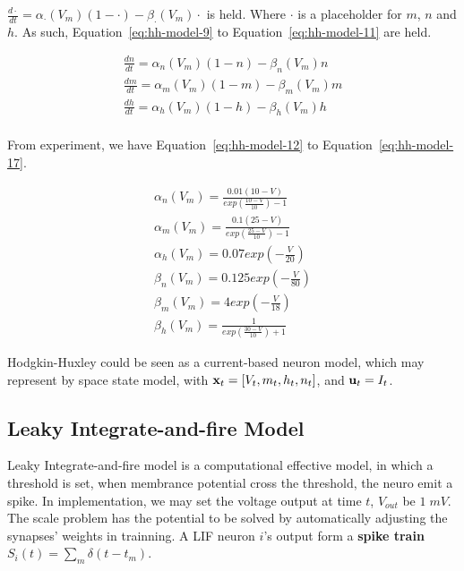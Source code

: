 $\frac{d\cdot}{dt}= \alpha_\cdot(V_m)(1-\cdot)-\beta_\cdot(V_m)\cdot $ is held. Where $\cdot$ is a placeholder for
$m$, $n$ and $h$. As such, Equation~\ref{eq:hh-model-9} to Equation~\ref{eq:hh-model-11} are held.

\begin{align}
    \frac{dn}{dt}= \alpha_n(V_m)(1-n)-\beta_n(V_m)n \label{eq:hh-model-9}\\
    \frac{dm}{dt}= \alpha_m(V_m)(1-m)-\beta_m(V_m)m \label{eq:hh-model-10}\\
    \frac{dh}{dt}= \alpha_h(V_m)(1-h)-\beta_h(V_m)h \label{eq:hh-model-11}\\
\end{align}

From experiment, 
we have Equation~\ref{eq:hh-model-12} to Equation~\ref{eq:hh-model-17}.

\begin{align}
    \alpha_n(V_m) = \frac{0.01(10-V)}{exp(\frac{10-V}{10}) - 1} \label{eq:hh-model-12}\\
    \alpha_m(V_m) = \frac{0.1(25-V)}{exp(\frac{25-V}{10}) - 1} \label{eq:hh-model-13}\\
    \alpha_h(V_m) = 0.07exp(-\frac{V}{20}) \label{eq:hh-model-14}\\
    \beta_n(V_m) = 0.125exp(-\frac{V}{80}) \label{eq:hh-model-15}\\
    \beta_m(V_m) = 4exp(-\frac{V}{18}) \label{eq:hh-model-16}\\
    \beta_h(V_m) = \frac{1}{exp(\frac{30-V}{10})+1} \label{eq:hh-model-17}
\end{align}

Hodgkin-Huxley could be seen as a current-based neuron model, which may represent by space state model,
with $\bold x_t = [V_t, m_t, h_t, n_t]$, and $\bold u_t = I_t$.

\subsection{Leaky Integrate-and-fire Model}
\label{sec:current-based-lif}
Leaky Integrate-and-fire model is a computational effective model, 
in which a threshold is set, when membrance potential cross the threshold, 
the neuro emit a spike. 
In implementation, we may set the voltage output at time $t$, $V_{out}$ be $1\;mV$. 
The scale problem has the potential to be solved by automatically adjusting the synapses' weights in trainning.
A LIF neuron $i$'s output form a \textbf{spike train} $S_{i}(t) = \sum_{m}\delta(t-t_m)$.

